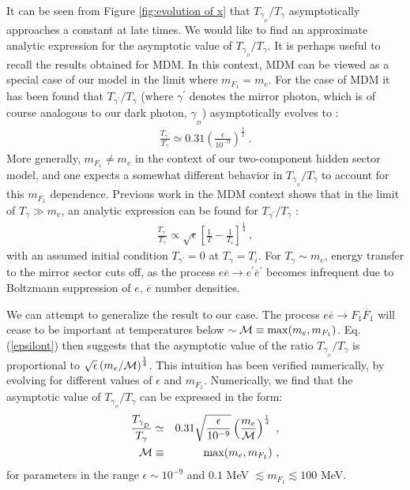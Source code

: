 \documentclass[12pt]{article}
\begin{document}
It can be seen from Figure \ref{fig:evolution of x} that $T _{\gamma _{_D}}/T _{\gamma}$ asymptotically approaches a constant at late times. We would like to find an approximate analytic expression for the asymptotic value of $T _{\gamma _{_D}}/T _{\gamma}$. It is perhaps useful to recall the results obtained for MDM. In this context, MDM can be viewed as a special case of our model in the limit where $m _{F_1} = m _e$. For the case of MDM it has been found that $T _{{\gamma} ^{'}}/T _{\gamma}$ (where $\gamma ^{'}$ denotes the mirror photon, which is of course analogous to our dark photon, $\gamma _{_D}$) asymptotically evolves to \cite{predictions}:
%
\begin{eqnarray}
\frac{T _{{\gamma} ^{'}}}{T _{\gamma}} \simeq 0.31 \left ( \frac{\epsilon}{10^{-9}} \right ) ^{\frac{1}{2}} \ .
\label{xmirror}
\end{eqnarray}
%
More generally, $m _{F_1} \neq m _e$ in the context of our two-component hidden sector model, and one expects a somewhat different behavior in $T _{\gamma _{_D}}/T _{\gamma}$ to account for this $m _{F_1}$ dependence. Previous work in the MDM context shows that in the limit of $T _{\gamma} \gg m _e$, an analytic expression can be found for $T _{{\gamma} ^{'}}/T _{\gamma}$ \cite{ciarcellutiliege}:
%
\begin{eqnarray}
\frac{T _{{\gamma} ^{'}}}{T _{\gamma}} \propto \sqrt{\epsilon} \left [ \frac{1}{T} - \frac{1}{T_i} \right ] ^{\frac{1}{4}} \ ,
\label{epsilont}
\end{eqnarray}
%
with an assumed initial condition $T _{{\gamma} ^{'}} = 0$ at $T _{\gamma} = T_i$. For $T _{\gamma} \sim m _e$, energy transfer to the mirror sector cuts off, as the process $e\overline{e} \rightarrow e ^{'}\overline{e} ^{'}$ becomes infrequent due to Boltzmann suppression of $e$, $\overline{e}$ number densities.

We can attempt to generalize the result to our case. The process $e\overline{e} \rightarrow F _1\overline{F} _1$ will cease to be important at temperatures below $\sim {\cal M} \equiv \max (m _e , m _{F_1})$. Eq.(\ref{epsilont}) then suggests that the asymptotic value of the ratio $T _{\gamma _{_D}}/T _{\gamma}$ is proportional to $\sqrt{\epsilon} \left (m _e/{\cal M} \right ) ^{\frac{1}{4}}$. This intuition has been verified numerically, by evolving for different values of $\epsilon$ and $m _{F_1}$. Numerically, we find that the asymptotic value of $T _{\gamma _{_D}}/T _{\gamma}$ can be expressed in the form:
%
\begin{eqnarray}
\frac{T _{\gamma _{_D}}}{T _{\gamma}} & \simeq & 0.31 \sqrt{\frac{\epsilon}{10^{-9}}} \left (\frac{m _e}{{\cal M}} \right ) ^{\frac{1}{4}} \ , \nonumber \\
{\cal M} & \equiv & \max (m _e, m _{F_1}) \ ,
\label{masterformula}
\end{eqnarray}
%
for parameters in the range $\epsilon \sim 10 ^{-9}$ and $0.1$ MeV $\lesssim m _{F_1} \lesssim 100$ MeV.
\end{document}
